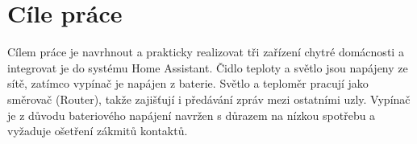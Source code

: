 \chapter*{Cíle práce}
{}

Cílem práce je navrhnout a prakticky realizovat tři zařízení chytré domácnosti
a integrovat je do systému Home Assistant. Čidlo teploty a světlo jsou
napájeny ze sítě, zatímco vypínač je napájen z baterie. Světlo a teploměr pracují jako
směrovač (Router), takže zajišťují i předávání zpráv mezi ostatními uzly.
Vypínač je z důvodu bateriového napájení navržen s důrazem na nízkou
spotřebu a vyžaduje ošetření zákmitů kontaktů.
